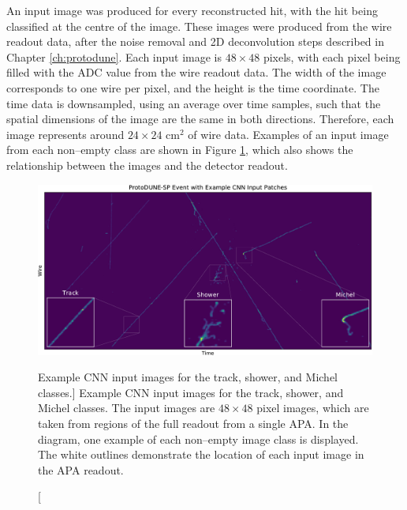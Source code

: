 An input image was produced for every reconstructed hit, with the hit being 
classified at the centre of the image. These images were produced from the 
wire readout data, after the noise removal and 2D deconvolution steps 
described in Chapter \ref{ch:protodune}. Each input image is $48 \times 48$ 
pixels, with each pixel being filled with the ADC value from the wire readout 
data. The width of the image corresponds to one wire per pixel, and the height 
is the time coordinate. The time data is downsampled, using an average over 
time samples, such that the spatial dimensions of the image are the same in 
both directions. Therefore, each image represents around $24 \times 24 \mbox{ 
cm}^2$ of wire data. Examples of an input image from each non--empty class are 
shown in Figure \ref{fig:patches}, which also shows the relationship between 
the images and the detector readout.

\begin{figure}
	\centering
	\includegraphics[width=\textwidth]{figures/patch_zoom.pdf}
	\caption
	[Example CNN input images for the track, shower, and Michel classes.]
	{Example CNN input images for the track, shower, and Michel classes. The 
	input images are $48 \times 48$ pixel images, which are taken from regions of 
	the full readout from a single APA. In the diagram, one example of each
	non--empty image class is displayed. The white outlines demonstrate the 
	location of each input image in the APA readout.}
	\label{fig:patches}
\end{figure}

